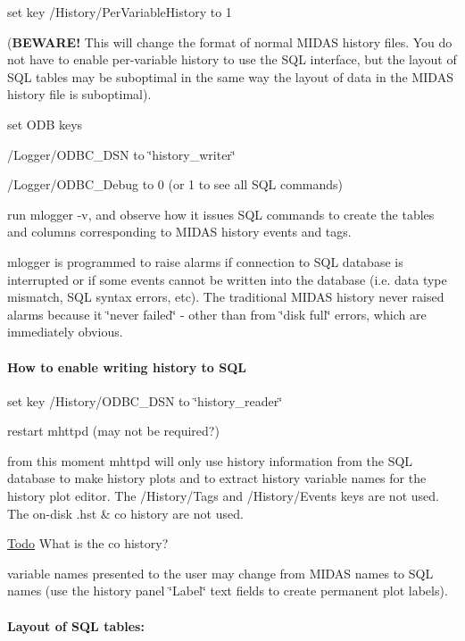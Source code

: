 \begin{DoxyEnumerate}
\item set key /History/PerVariableHistory to 1 \par
({\bfseries BEWARE!} This will change the format of normal MIDAS history files. You do not have to enable per-\/variable history to use the SQL interface, but the layout of SQL tables may be suboptimal in the same way the layout of data in the MIDAS history file is suboptimal). 
\item set ODB keys 
\begin{DoxyItemize}
\item /Logger/ODBC\_\-DSN to \char`\"{}history\_\-writer\char`\"{} 
\item /Logger/ODBC\_\-Debug to 0 (or 1 to see all SQL commands) 
\end{DoxyItemize}
\item run mlogger -\/v, and observe how it issues SQL commands to create the tables and columns corresponding to MIDAS history events and tags. 
\item mlogger is programmed to raise alarms if connection to SQL database is interrupted or if some events cannot be written into the database (i.e. data type mismatch, SQL syntax errors, etc). The traditional MIDAS history never raised alarms because it \char`\"{}never failed\char`\"{} -\/ other than from \char`\"{}disk full\char`\"{} errors, which are immediately obvious. 
\end{DoxyEnumerate}\hypertarget{F_History_logging_F_History_sql_enable}{}\paragraph{How to enable writing history to SQL}\label{F_History_logging_F_History_sql_enable}

\begin{DoxyEnumerate}
\item set key /History/ODBC\_\-DSN to \char`\"{}history\_\-reader\char`\"{} 
\item restart mhttpd (may not be required?) 
\item from this moment mhttpd will only use history information from the SQL database to make history plots and to extract history variable names for the history plot editor. The /History/Tags and /History/Events keys are not used. The on-\/disk .hst \& co history are not used. \begin{Desc}
\item[\hyperlink{todo__todo000013}{Todo}]What is the co history?\end{Desc}

\item variable names presented to the user may change from MIDAS names to SQL names (use the history panel \char`\"{}Label\char`\"{} text fields to create permanent plot labels). 
\end{DoxyEnumerate}\hypertarget{F_History_logging_F_SQL_Layout}{}\paragraph{Layout of SQL tables:}\label{F_History_logging_F_SQL_Layout}

